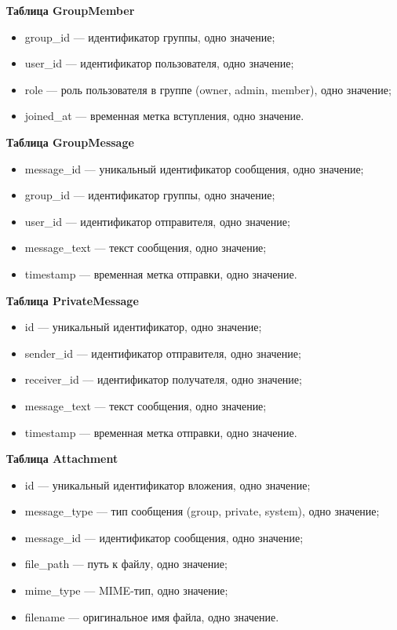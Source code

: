 \textbf{Таблица GroupMember}  
\begin{itemize}
	\item group\_id — идентификатор группы, одно значение;
	\item user\_id — идентификатор пользователя, одно значение;
	\item role — роль пользователя в группе (owner, admin, member), одно значение;
	\item joined\_at — временная метка вступления, одно значение.
\end{itemize}

\textbf{Таблица GroupMessage}  
\begin{itemize}
	\item message\_id — уникальный идентификатор сообщения, одно значение;
	\item group\_id — идентификатор группы, одно значение;
	\item user\_id — идентификатор отправителя, одно значение;
	\item message\_text — текст сообщения, одно значение;
	\item timestamp — временная метка отправки, одно значение.
\end{itemize}

\textbf{Таблица PrivateMessage}  
\begin{itemize}
	\item id — уникальный идентификатор, одно значение;
	\item sender\_id — идентификатор отправителя, одно значение;
	\item receiver\_id — идентификатор получателя, одно значение;
	\item message\_text — текст сообщения, одно значение;
	\item timestamp — временная метка отправки, одно значение.
\end{itemize}

\textbf{Таблица Attachment}  
\begin{itemize}
	\item id — уникальный идентификатор вложения, одно значение;
	\item message\_type — тип сообщения (group, private, system), одно значение;
	\item message\_id — идентификатор сообщения, одно значение;
	\item file\_path — путь к файлу, одно значение;
	\item mime\_type — MIME-тип, одно значение;
	\item filename — оригинальное имя файла, одно значение.
\end{itemize}


